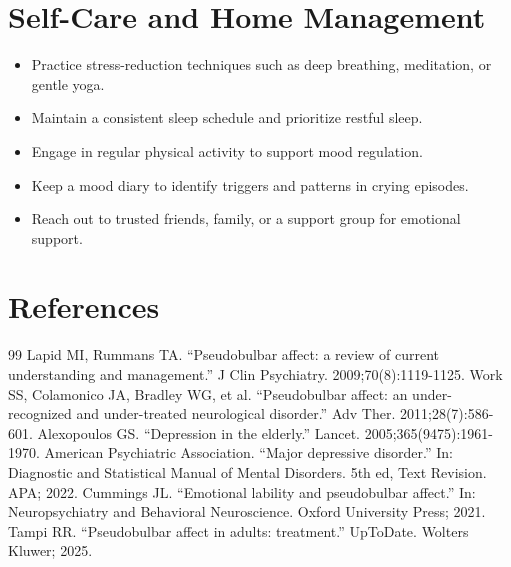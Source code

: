 \section*{Self-Care and Home Management}
\begin{itemize}
  \item Practice stress-reduction techniques such as deep breathing, meditation, or gentle yoga.
  \item Maintain a consistent sleep schedule and prioritize restful sleep.
  \item Engage in regular physical activity to support mood regulation.
  \item Keep a mood diary to identify triggers and patterns in crying episodes.
  \item Reach out to trusted friends, family, or a support group for emotional support.
\end{itemize}

\section*{References}
\begin{thebibliography}{99}
 Lapid MI, Rummans TA. ``Pseudobulbar affect: a review of current understanding and management.'' J Clin Psychiatry. 2009;70(8):1119-1125.
 Work SS, Colamonico JA, Bradley WG, et al. ``Pseudobulbar affect: an under-recognized and under-treated neurological disorder.'' Adv Ther. 2011;28(7):586-601.
 Alexopoulos GS. ``Depression in the elderly.'' Lancet. 2005;365(9475):1961-1970.
 American Psychiatric Association. ``Major depressive disorder.'' In: Diagnostic and Statistical Manual of Mental Disorders. 5th ed, Text Revision. APA; 2022.
 Cummings JL. ``Emotional lability and pseudobulbar affect.'' In: Neuropsychiatry and Behavioral Neuroscience. Oxford University Press; 2021.
 Tampi RR. ``Pseudobulbar affect in adults: treatment.'' UpToDate. Wolters Kluwer; 2025.
\end{thebibliography}
